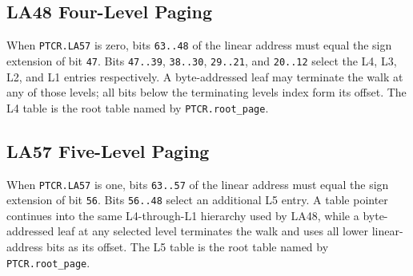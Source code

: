 \clearpage
\subsection{LA48 Four-Level Paging}

When \texttt{PTCR.LA57} is zero, bits \texttt{63..48} of the linear address must equal the sign extension of bit
\texttt{47}. Bits \texttt{47..39}, \texttt{38..30}, \texttt{29..21}, and \texttt{20..12} select the L4, L3, L2,
and L1 entries respectively. A byte-addressed leaf may terminate the walk at any of those levels; all bits below
the terminating level\textquotesingle{}s index form its offset. The L4 table is the root table named by \texttt{PTCR.root\_page}.



\clearpage
\subsection{LA57 Five-Level Paging}

When \texttt{PTCR.LA57} is one, bits \texttt{63..57} of the linear address must equal the sign extension of bit
\texttt{56}. Bits \texttt{56..48} select an additional L5 entry. A table pointer continues into the same
L4-through-L1 hierarchy used by LA48, while a byte-addressed leaf at any selected level terminates the walk and uses
all lower linear-address bits as its offset. The L5 table is the root table named by \texttt{PTCR.root\_page}.


